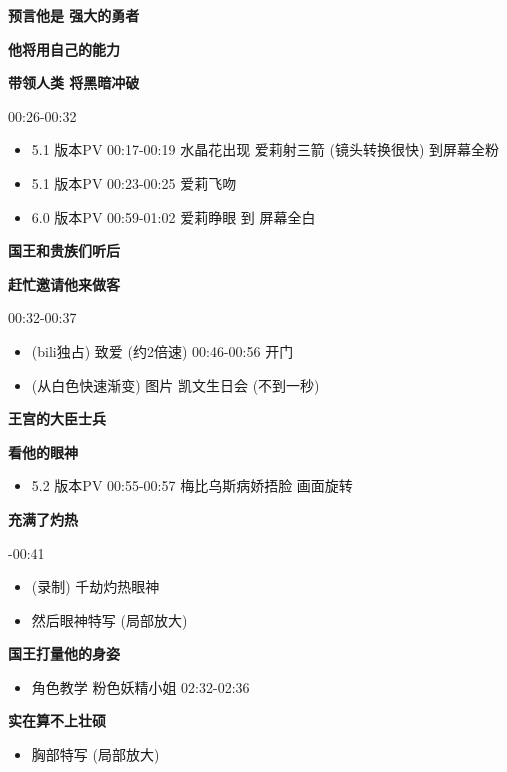 \documentclass[a4paper]{article}
\begin{document}
\textbf{预言他是 强大的勇者}

\textbf{他将用自己的能力}

\textbf{带领人类 将黑暗冲破}

00:26-00:32

\begin{itemize}
    \item 5.1 版本PV 00:17-00:19 水晶花出现 爱莉射三箭 (镜头转换很快) 到屏幕全粉
    \item 5.1 版本PV 00:23-00:25 爱莉飞吻
    \item 6.0 版本PV 00:59-01:02 爱莉睁眼 到 屏幕全白
\end{itemize}

\textbf{国王和贵族们听后}

\textbf{赶忙邀请他来做客}

00:32-00:37

\begin{itemize}
    \item (bili独占) 致爱 (约2倍速) 00:46-00:56 开门
    \item (从白色快速渐变) 图片 凯文生日会 (不到一秒)
\end{itemize}

\textbf{王宫的大臣士兵}

\textbf{看他的眼神}

\begin{itemize}
    \item 5.2 版本PV 00:55-00:57 梅比乌斯病娇捂脸 画面旋转
\end{itemize}

\textbf{充满了灼热}

-00:41
 
\begin{itemize}
    \item (录制) 千劫灼热眼神
    \item 然后眼神特写 (局部放大)
\end{itemize}

\textbf{国王打量他的身姿}

\begin{itemize}
    \item 角色教学 粉色妖精小姐 02:32-02:36
\end{itemize}

\textbf{实在算不上壮硕}

\begin{itemize}
    \item 胸部特写 (局部放大)
\end{itemize}
\end{document}
